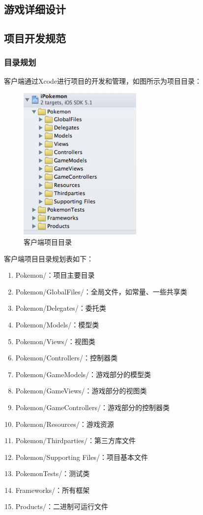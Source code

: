 \documentclass{article}
\begin{document}
\begin{CJK}{UTF8}{gbsn}
	\section{游戏详细设计}
	\subsection{项目开发规范}
	\subsubsection{目录规划}
  客户端通过Xcode进行项目的开发和管理，如图所示为项目目录：

  \begin{figure}[htbp]
		\centering
		\includegraphics[bb=0 0 229 289, scale=0.45]{figure/fig_n09.png}
		\caption{客户端项目目录}
		\label{fig:n09}
	\end{figure}
  
  客户端项目目录规划表如下：
  
  \begin{enumerate}
		\item Pokemon/：项目主要目录
		\item Pokemon/GlobalFiles/：全局文件，如常量、一些共享类
		\item Pokemon/Delegates/：委托类
		\item Pokemon/Models/：模型类
		\item Pokemon/Views/：视图类
		\item Pokemon/Controllers/：控制器类
		\item Pokemon/GameModels/：游戏部分的模型类
		\item Pokemon/GameViews/：游戏部分的视图类
		\item Pokemon/GameControllers/：游戏部分的控制器类
		\item Pokemon/Resources/：游戏资源
		\item Pokemon/Thirdparties/：第三方库文件
		\item Pokemon/Supporting Files/：项目基本文件
		\item PokemonTests/：测试类
		\item Frameworks/：所有框架
		\item Products/：二进制可运行文件
  \end{enumerate}


\end{CJK}
\end{document}
